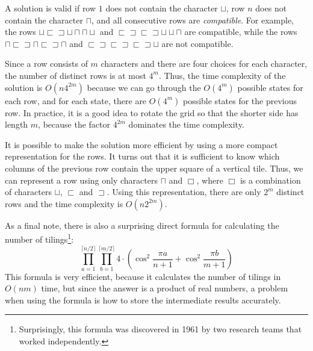 A solution is valid if row $1$ does not contain
the character $\sqcup$,
row $n$ does not contain the character $\sqcap$,
and all consecutive rows are \emph{compatible}.
For example, the rows
$\sqcup \sqsubset \sqsupset \sqcup \sqcap \sqcap \sqcup$ and
$\sqsubset \sqsupset \sqsubset \sqsupset \sqcup \sqcup \sqcap$ 
are compatible, while the rows
$\sqcap \sqsubset \sqsupset \sqcap \sqsubset \sqsupset \sqcap$ and
$\sqsubset \sqsupset \sqsubset \sqsupset \sqsubset \sqsupset \sqcup$
are not compatible.

Since a row consists of $m$ characters and there are
four choices for each character, the number of distinct
rows is at most $4^m$.
Thus, the time complexity of the solution is
$O(n 4^{2m})$ because we can go through the
$O(4^m)$ possible states for each row,
and for each state, there are $O(4^m)$
possible states for the previous row.
In practice, it is a good idea to rotate the grid
so that the shorter side has length $m$,
because the factor $4^{2m}$ dominates the time complexity.

It is possible to make the solution more efficient
by using a more compact representation for the rows.
It turns out that it is sufficient to know which
columns of the previous row contain the upper square
of a vertical tile.
Thus, we can represent a row using only characters
$\sqcap$ and $\Box$, where $\Box$ is a combination
of characters
$\sqcup$, $\sqsubset$ and $\sqsupset$.
Using this representation, there are only
$2^m$ distinct rows and the time complexity is
$O(n 2^{2m})$.

As a final note, there is also a surprising direct formula
for calculating the number of tilings\footnote{Surprisingly,
this formula was discovered in 1961 by two research teams \cite{kas61,tem61}
that worked independently.}:
\[ \prod_{a=1}^{\lceil n/2 \rceil} \prod_{b=1}^{\lceil m/2 \rceil} 4 \cdot \left(\cos^2 \frac{\pi a}{n + 1} + \cos^2 \frac{\pi b}{m+1}\right)\]
This formula is very efficient, because it calculates
the number of tilings in $O(nm)$ time,
but since the answer is a product of real numbers,
a problem when using the formula is
how to store the intermediate results accurately.


